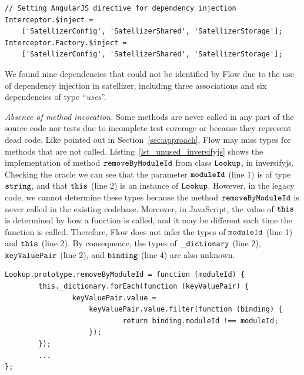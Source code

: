 \documentclass[review]{elsarticle}
\newcommand{\aspas}[1]{{``#1''}}
\newcommand{\mcode}[1]{$\tt #1$}
\begin{document}

\begin{lstlisting}[caption=Setting dependency injection directives in {\sc satellizer}, label=lst_di_angularjs_satellizer, emph={[2]$inject},emphstyle={[2]\ttfamily\bfseries\color{darkgreen}}]
// Setting AngularJS directive for dependency injection
Interceptor.$inject = 
	['SatellizerConfig', 'SatellizerShared', 'SatellizerStorage'];
Interceptor.Factory.$inject = 
	['SatellizerConfig', 'SatellizerShared', 'SatellizerStorage'];

\end{lstlisting} 

We found nine dependencies that could not be identified by Flow due to the use of dependency injection in {\sc satellizer}, including three associations and six dependencies of type \aspas{\textit{uses}}.

\vspace{0.3cm}

\noindent \textit{Absence of method invocation.} Some methods are never called in any part of the source code nor tests due to incomplete test coverage or because they represent dead code. Like pointed out in Section~\ref{sec:approach}, Flow may miss types for methods that are not called. Listing~\ref{lst_unused_inversifyjs} shows the implementation of method \mcode{removeByModuleId} from class \mcode{Lookup}, in {\sc inversifyjs}. Checking the oracle we can see that the parameter \mcode{moduleId} (line 1) is of type \mcode{string}, and that \mcode{this} (line 2) is an instance of \mcode{Lookup}. However, in the legacy code, we cannot determine these types because the method \mcode{removeByModuleId} is never called in the existing codebase. Moreover, in JavaScript, the value of \mcode{this} is determined by how a function is called, and it may be different each time the function is called. Therefore, Flow does not infer the types of \mcode{moduleId} (line 1) and \mcode{this} (line 2). By consequence, the types of \mcode{\_dictionary} (line 2), \mcode{keyValuePair} (line 2), and \mcode{binding} (line 4) are also unknown.

\begin{lstlisting}[caption=Example of method that is not used in {\sc inversifyjs}, label=lst_unused_inversifyjs,  emph={[2]moduleId},emphstyle={[2]\ttfamily\bfseries\color{darkgreen}}, emph={[3]},emphstyle={[3]\ttfamily\bfseries\color{purple}}]
Lookup.prototype.removeByModuleId = function (moduleId) {
		this._dictionary.forEach(function (keyValuePair) {
				keyValuePair.value = 
					keyValuePair.value.filter(function (binding) {
							return binding.moduleId !== moduleId;
					});
		});
		...
};
\end{lstlisting} 
\end{document}
